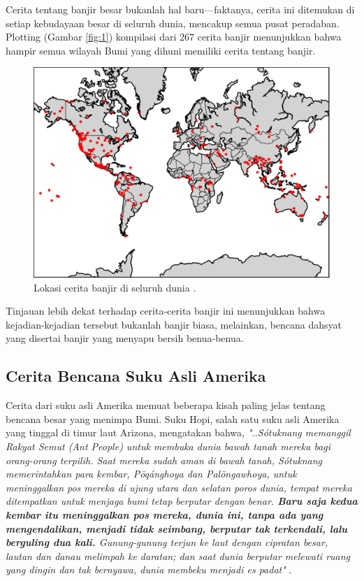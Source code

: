 \documentclass[10pt,twocolumn,letterpaper]{article}
\begin{document}
Cerita tentang banjir besar bukanlah hal baru—faktanya, cerita ini ditemukan di setiap kebudayaan besar di seluruh dunia, mencakup semua pusat peradaban. Plotting (Gambar \ref{fig:1}) kompilasi dari 267 cerita banjir \cite{3} menunjukkan bahwa hampir semua wilayah Bumi yang dihuni memiliki cerita tentang banjir.

\begin{figure}[h]
\begin{center}
   \includegraphics[width=1\linewidth]{b.png}
\end{center}
   \caption{Lokasi cerita banjir di seluruh dunia \cite{3}.}
\label{fig:1}
\label{fig:onecol}
\end{figure}

Tinjauan lebih dekat terhadap cerita-cerita banjir ini menunjukkan bahwa kejadian-kejadian tersebut bukanlah banjir biasa, melainkan, bencana dahsyat yang disertai banjir yang menyapu bersih benua-benua.

\subsection{Cerita Bencana Suku Asli Amerika}

Cerita dari suku asli Amerika memuat beberapa kisah paling jelas tentang bencana besar yang menimpa Bumi. Suku Hopi, salah satu suku asli Amerika yang tinggal di timur laut Arizona, mengatakan bahwa, \textit{"..Sótuknang memanggil Rakyat Semut (Ant People) untuk membuka dunia bawah tanah mereka bagi orang-orang terpilih. Saat mereka sudah aman di bawah tanah, Sótuknang memerintahkan para kembar, Pöqánghoya dan Palöngawhoya, untuk meninggalkan pos mereka di ujung utara dan selatan poros dunia, tempat mereka ditempatkan untuk menjaga bumi tetap berputar dengan benar. \textbf{Baru saja kedua kembar itu meninggalkan pos mereka, dunia ini, tanpa ada yang mengendalikan, menjadi tidak seimbang, berputar tak terkendali, lalu berguling dua kali.} Gunung-gunung terjun ke laut dengan cipratan besar, lautan dan danau melimpah ke daratan; dan saat dunia berputar melewati ruang yang dingin dan tak bernyawa, dunia membeku menjadi es padat"} \cite{4}.
\end{document}
